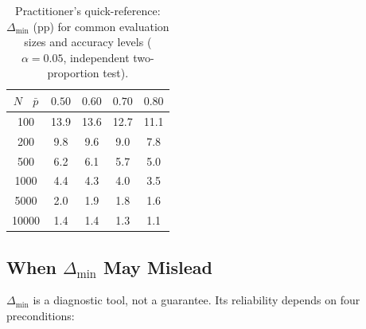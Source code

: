 \documentclass[pdflatex,sn-mathphys-ay,oneside]{sn-jnl}
\theoremstyle{thmstylethree}
\begin{document}
\begin{table}[t]
\caption{Practitioner's quick-reference: $\Delta_{\min}$ (pp) for common evaluation sizes and accuracy levels ($\alpha=0.05$, independent two-proportion test).}
\label{tab:delta_min}
\centering
\begin{tabular}{c|cccc}
\toprule
$N$ \ $\bar{p}$ & $0.50$ & $0.60$ & $0.70$ & $0.80$ \\
\midrule
100   & 13.9 & 13.6 & 12.7 & 11.1 \\
200   & 9.8  & 9.6  & 9.0  & 7.8  \\
500   & 6.2  & 6.1  & 5.7  & 5.0  \\
1000  & 4.4  & 4.3  & 4.0  & 3.5  \\
5000  & 2.0  & 1.9  & 1.8  & 1.6  \\
10000 & 1.4  & 1.4  & 1.3  & 1.1  \\
\bottomrule
\end{tabular}
\end{table}

\subsection{When $\Delta_{\min}$ May Mislead}\label{sec:mislead}

$\Delta_{\min}$ is a diagnostic tool, not a guarantee. Its reliability depends on four preconditions:
\end{document}
